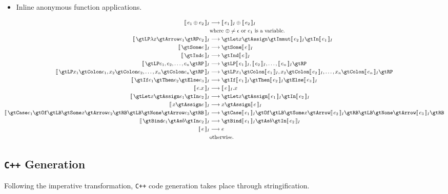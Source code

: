 \documentclass{article}
\begin{document}
    \begin{itemize}
        \item Inline anonymous function applications.
    \end{itemize}
%
    \begin{adjustwidth}{-0.5in}{-0.5in}\begin{align*}
        \eqI{e_1 \oplus e_2}{\intI{e_1} \oplus \intI{e_2}}{where $\oplus \neq \epsilon$ or $e_1$ is a variable.} \\
        \eqI{\gtLP \lambda x \gtArrow e_1 \gtRP e_2}{\gtLet x \gtAssign \gtImmut \intI{e_2} \gtIn \intI{e_1}}{} \\
        \eqI{\gtSome e}{\gtSome \intI{e}}{} \\
        \eqI{\gtInd e}{\gtInd \intI{e}}{} \\
        \eqI{\gtLP e_1, e_2, \ldots, e_n \gtRP}{\gtLP \intI{e_1}, \intI{e_2}, \ldots, \intI{e_n} \gtRP}{} \\
        \eqI{\gtLP x_1 \gtColon e_1, x_2 \gtColon e_2, \ldots, x_n \gtColon e_n \gtRP}
            {\gtLP x_1 \gtColon \intI{e_1}, x_2 \gtColon \intI{e_2}, \ldots, x_n \gtColon \intI{e_n} \gtRP}{} \\
        \eqI{\gtIf e_1 \gtThen e_2 \gtElse e_3}{\gtIf \intI{e_1} \gtThen \intI{e_2} \gtElse \intI{e_3}}{} \\
        \eqI{e.x}{\intI{e}.x}{} \\
        \eqI{\gtLet x \gtAssign e_1 \gtIn e_2}{\gtLet x \gtAssign \intI{e_1} \gtIn \intI{e_2}}{} \\
        \eqI{x \gtAssign e}{x \gtAssign \intI{e}}{} \\
        \eqI{\gtCase e_1 \gtOf \gtLB \gtSome x \gtArrow e_2 \gtRB
                \gtLB \gtNone \gtArrow e_3 \gtRB}
            {\gtCase \intI{e_1} \gtOf \gtLB \gtSome x \gtArrow \intI{e_2} \gtRB
                \gtLB \gtNone \gtArrow \intI{e_3} \gtRB}
            {} \\
        \eqI{\gtBind e_1 \gtAs b \gtIn e_2}{\gtBind \intI{e_1} \gtAs b \gtIn \intI{e_2}}{} \\
        \eqI{e}{e}{otherwise.}
    \end{align*}\end{adjustwidth}

    \subsection{\texttt{C++} Generation}

    Following the imperative transformation, \texttt{C++} code generation takes place through
    stringification.
\end{document}
